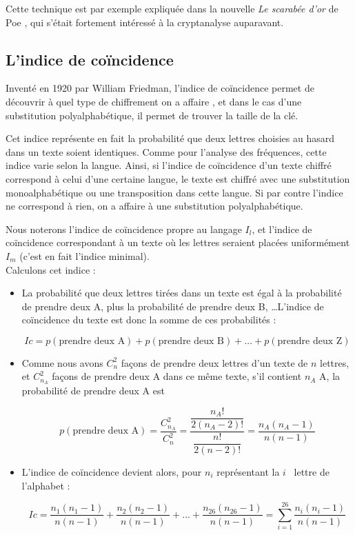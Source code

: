 Cette technique est par exemple expliquée dans la nouvelle
\emph{Le scarabée d'or} de Poe \cite{Poe}, qui s'était fortement 
intéressé à la cryptanalyse auparavant.


\subsection{L'indice de coïncidence}
Inventé en 1920 par William Friedman, l'indice de coïncidence
permet de découvrir à quel type de chiffrement on a affaire 
, et dans le cas d'une
substitution polyalphabétique, il permet de trouver la taille de
la clé.

Cet indice représente en fait la probabilité que deux lettres
choisies au hasard dans un texte soient identiques. Comme pour
l'analyse des fréquences, cette indice varie selon la langue.
Ainsi, si l'indice de coïncidence d'un texte chiffré correspond à
celui d'une certaine langue, le texte est chiffré avec une
substitution monoalphabétique ou une transposition dans cette 
langue. Si par contre l'indice ne correspond à rien, on a affaire 
à une substitution polyalphabétique.

Nous noterons l'indice de coïncidence propre au langage $I_l$, et
l'indice de coïncidence correspondant à un texte où les lettres
seraient placées uniformément $I_m$ (c'est en fait l'indice
minimal). 
\\

Calculons cet indice :
\begin{itemize}
  \item La probabilité que deux lettres tirées dans un texte est
égal à la probabilité de prendre deux A, plus la probabilité de
prendre deux B, \dots L'indice de coïncidence du texte est donc la
somme de ces probabilités :
  \begin{center}
    \[ Ic = p(\mbox{prendre deux A}) + p(\mbox{prendre deux B}) +
\dots + p(\mbox{prendre deux Z}) \]
  \end{center}
  \item Comme nous avons $C_{n}^2$ façons de prendre deux lettres
d'un texte de $n$ lettres, et $C_{n_A}^2$ façons de prendre deux A
dans ce même texte, s'il contient $n_A$ A, la probabilité de prendre 
deux A est
  \begin{center}
    \[ p(\mbox{prendre deux A}) = \dfrac{C_{n_A}^2}{C_{n}^2} =
\dfrac{\dfrac{n_A!}{2 (n_A - 2)!}}{\dfrac{n!}{2 (n - 2)!}} = 
\dfrac{n_A (n_A - 1)}{n (n - 1)} \]
  \end{center}
  \item L'indice de coïncidence devient alors, pour $n_i$
représentant la $i$\ieme~ lettre de l'alphabet :
  \begin{center}
    \[ Ic = \frac{n_1 (n_1 - 1)}{n (n - 1)} + \frac{n_2 (n_2 - 1)}{n
(n - 1)} + \dots + \frac{n_{26} (n_{26} - 1)}{n (n - 1)} = \sum_{i
= 1}^{26} \frac{n_i (n_i - 1)}{n (n - 1)} \] 
  \end{center}
\end{itemize}

